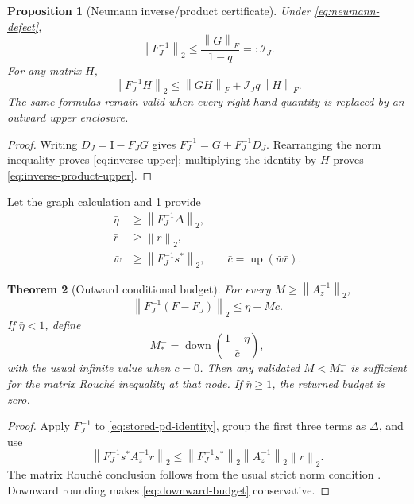 \documentclass[11pt]{article}
\newtheorem{theorem}{Theorem}[section]
\newtheorem{proposition}[theorem]{Proposition}
\theoremstyle{definition}
\theoremstyle{remark}
\newcommand{\Id}{\mathrm I}
\newcommand{\up}{\operatorname{up}}
\newcommand{\down}{\operatorname{down}}
\newcommand{\norm}[1]{\left\lVert#1\right\rVert}
\begin{document}
\begin{proposition}[Neumann inverse/product certificate]
\label{prop:neumann}
Under \cref{eq:neumann-defect},
\begin{equation}
 \norm{F_J^{-1}}_2
 \leq \frac{\norm{G}_F}{1-q}=:\mathcal I_J.
 \label{eq:inverse-upper}
\end{equation}
For any matrix \(H\),
\begin{equation}
 \norm{F_J^{-1}H}_2
 \leq \norm{GH}_F+\mathcal I_Jq\norm{H}_F.
 \label{eq:inverse-product-upper}
\end{equation}
The same formulas remain valid when every right-hand quantity is replaced
by an outward upper enclosure.
\end{proposition}

\begin{proof}
Writing \(D_J=\Id-F_JG\) gives
\(F_J^{-1}=G+F_J^{-1}D_J\).  Rearranging the norm inequality proves
\cref{eq:inverse-upper}; multiplying the identity by \(H\) proves
\cref{eq:inverse-product-upper}.
\end{proof}

Let the graph calculation and \cref{prop:neumann} provide
\begin{align}
 \bar\eta&\geq\norm{F_J^{-1}\Delta}_2,\\
 \bar r&\geq\norm r_2,\\
 \bar w&\geq\norm{F_J^{-1}s^*}_2,
 \qquad \bar c=\up(\bar w\bar r).
 \label{eq:eta-c}
\end{align}

\begin{theorem}[Outward conditional budget]
\label{thm:outward-budget}
For every \(M\geq\norm{A_z^{-1}}_2\),
\begin{equation}
 \norm{F_J^{-1}(F-F_J)}_2
 \leq\bar\eta+M\bar c.
 \label{eq:outward-rouche}
\end{equation}
If \(\bar\eta<1\), define
\begin{equation}
 M_*^-=\down\!\left(\frac{1-\bar\eta}{\bar c}\right),
 \label{eq:downward-budget}
\end{equation}
with the usual infinite value when \(\bar c=0\).  Then any validated
\(M<M_*^-\) is sufficient for the matrix Rouch\'e inequality at that node.
If \(\bar\eta\geq1\), the returned budget is zero.
\end{theorem}

\begin{proof}
Apply \(F_J^{-1}\) to \cref{eq:stored-pd-identity}, group the first three
terms as \(\Delta\), and use
\[
 \norm{F_J^{-1}s^*A_z^{-1}r}_2
 \leq\norm{F_J^{-1}s^*}_2\norm{A_z^{-1}}_2\norm r_2.
\]
The matrix Rouch\'e conclusion follows from the usual strict norm condition
\citep{GohbergSigal1971}.  Downward rounding makes
\cref{eq:downward-budget} conservative.
\end{proof}
\end{document}
